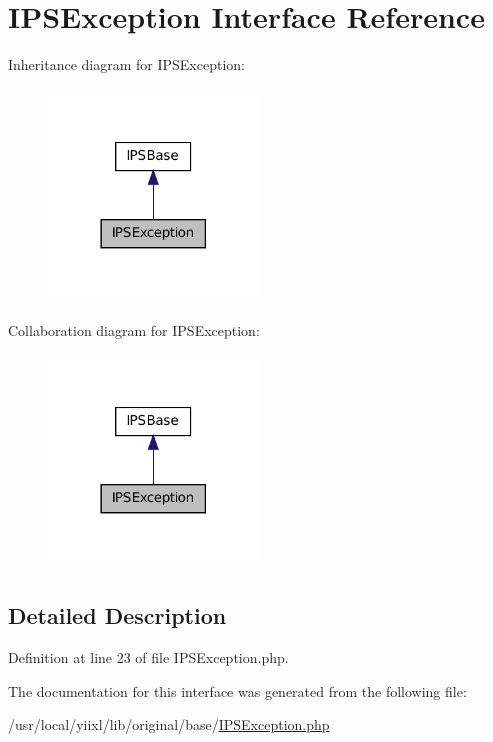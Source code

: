 \hypertarget{interfaceIPSException}{
\section{IPSException Interface Reference}
\label{interfaceIPSException}
}


Inheritance diagram for IPSException:\nopagebreak
\begin{figure}[H]
\begin{center}
\leavevmode
\includegraphics[width=158pt]{interfaceIPSException__inherit__graph}
\end{center}
\end{figure}


Collaboration diagram for IPSException:\nopagebreak
\begin{figure}[H]
\begin{center}
\leavevmode
\includegraphics[width=158pt]{interfaceIPSException__coll__graph}
\end{center}
\end{figure}


\subsection{Detailed Description}


Definition at line 23 of file IPSException.php.



The documentation for this interface was generated from the following file:\begin{DoxyCompactItemize}
\item 
/usr/local/yiixl/lib/original/base/\hyperlink{IPSException_8php}{IPSException.php}\end{DoxyCompactItemize}
